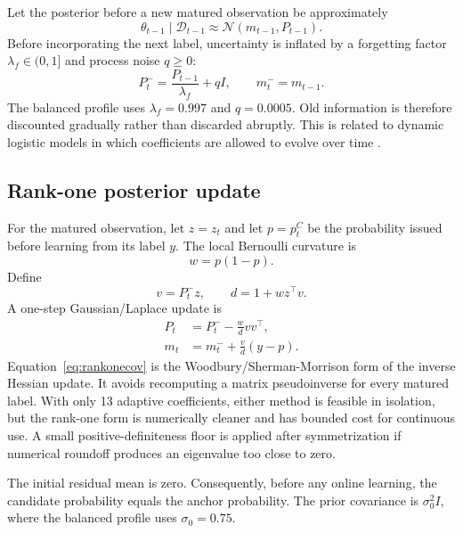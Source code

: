 \documentclass[11pt]{article}
\begin{document}
Let the posterior before a new matured observation be approximately
\begin{equation}
\theta_{t-1}\mid\mathcal D_{t-1}\approx\mathcal N(m_{t-1},P_{t-1}).
\end{equation}
Before incorporating the next label, uncertainty is inflated by a forgetting factor $\lambda_f\in(0,1]$ and process noise $q\ge0$:
\begin{equation}
P_t^-=\frac{P_{t-1}}{\lambda_f}+qI,
\qquad
m_t^-=m_{t-1}.
\label{eq:dynamicprior}
\end{equation}
The balanced profile uses $\lambda_f=0.997$ and $q=0.0005$. Old information is therefore discounted gradually rather than discarded abruptly. This is related to dynamic logistic models in which coefficients are allowed to evolve over time \citep{penny1999dynamic,mccormick2012dynamic}.

\subsection{Rank-one posterior update}

For the matured observation, let $z=z_t$ and let $p=p_t^C$ be the probability issued before learning from its label $y$. The local Bernoulli curvature is
\begin{equation}
w=p(1-p).
\end{equation}
Define
\begin{equation}
v=P_t^-z,
\qquad
d=1+wz^\top v.
\label{eq:vd}
\end{equation}
A one-step Gaussian/Laplace update is
\begin{align}
P_t &= P_t^- - \frac{w}{d}vv^\top,
\label{eq:rankonecov}\\
m_t &= m_t^- + \frac{v}{d}(y-p).
\label{eq:rankonemean}
\end{align}
Equation~\eqref{eq:rankonecov} is the Woodbury/Sherman-Morrison form of the inverse Hessian update. It avoids recomputing a matrix pseudoinverse for every matured label. With only 13 adaptive coefficients, either method is feasible in isolation, but the rank-one form is numerically cleaner and has bounded cost for continuous use. A small positive-definiteness floor is applied after symmetrization if numerical roundoff produces an eigenvalue too close to zero.

The initial residual mean is zero. Consequently, before any online learning, the candidate probability equals the anchor probability. The prior covariance is $\sigma_0^2I$, where the balanced profile uses $\sigma_0=0.75$.
\end{document}
